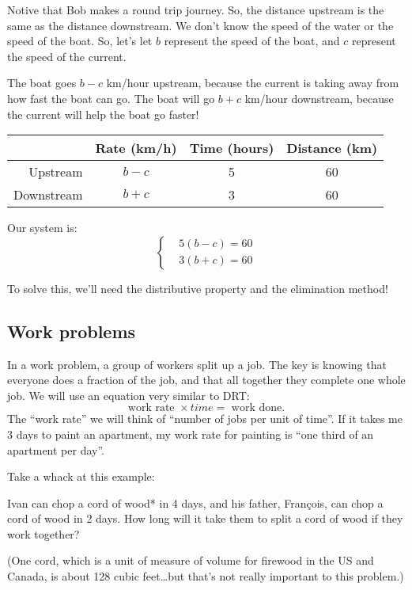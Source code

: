 Notive that Bob makes a round trip journey. So, the distance upstream is the same as the distance downstream. We don't know the speed of the water or the speed of the boat. So, let's let $b$ represent the speed of the boat, and $c$ represent the speed of the current.

The boat goes $b-c$ km/hour upstream, because the current is taking away from how fast the boat can go. The boat will go $b+c$ km/hour downstream, because the current will help the boat go faster!

\begin{center}
\begin{tabular}{r|ccc}
				& Rate (km/h)			& Time (hours)		& Distance (km)\\\hline
Upstream		& $b-c$				& 5					& 60\\
Downstream	& $b+c$				& 3					& 60\\
\end{tabular}
\end{center}

Our system is:
\[
\left\{%
\begin{aligned}
&5(b-c) = 60\\
&3(b+c) = 60
\end{aligned}
\right.
\]

To solve this, we'll need the distributive property and the elimination method!

\subsection*{Work problems}

In a work problem, a group of workers split up a job. The key is knowing that everyone does a fraction of the job, and that all together they complete one whole job. We will use an equation very similar to DRT:\[\text{work rate } \times { time } = \text{ work done}.\]
The ``work rate'' we will think of ``number of jobs per unit of time''. If it takes me 3 days to paint an apartment, my work rate for painting is ``one third of an apartment per day''.

Take a whack at this example:

\begin{boxedex}[Work]
Ivan can chop a cord of wood* in 4 days, and his father, Fran\c{c}ois, can chop a cord of wood in 2 days. How long will it take them to split a cord of wood if they work together?

(One cord, which is a unit of measure of volume for firewood in the US and Canada, is about 128 cubic feet\ldots but that's not really important to this problem.)
\end{boxedex}

